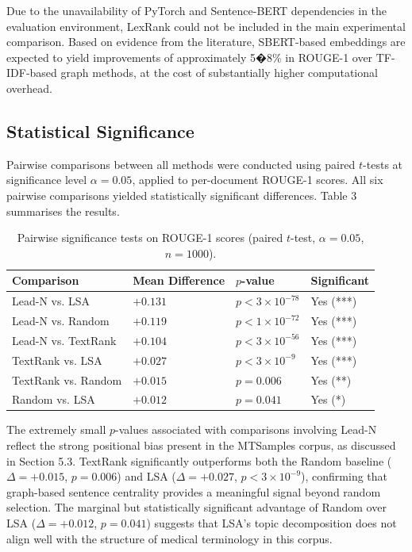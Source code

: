 \documentclass[12pt,twoside,en,win]{bmzhart}
\begin{document}
	Due to the unavailability of PyTorch and Sentence-BERT dependencies in the evaluation environment, LexRank could 
	not be included in the main experimental comparison. Based on evidence from the literature, SBERT-based embeddings 
	are expected to yield improvements of approximately 5�8\% in ROUGE-1 over TF-IDF-based graph methods, at the cost of 
	substantially higher computational overhead.

	\subsection{Statistical Significance}

	Pairwise comparisons between all methods were conducted using paired $t$-tests at significance level $\alpha = 0.05$, 
	applied to per-document ROUGE-1 scores. All six pairwise comparisons yielded statistically significant differences. 
	Table 3 summarises the results.

	\begin{table}[h]
	\centering
	\caption{Pairwise significance tests on ROUGE-1 scores (paired $t$-test, $\alpha = 0.05$, $n = 1000$).}
	\label{tab:significance-tests}
	\begin{tabular}{@{}llll@{}}
	\toprule
	\textbf{Comparison} & \textbf{Mean Difference} & \textbf{$p$-value} & \textbf{Significant} \\ \midrule
	Lead-N vs. LSA      & $+0.131$ & $p < 3 \times 10^{-78}$ & Yes (***) \\
	Lead-N vs. Random   & $+0.119$ & $p < 1 \times 10^{-72}$ & Yes (***) \\
	Lead-N vs. TextRank & $+0.104$ & $p < 3 \times 10^{-56}$ & Yes (***) \\
	TextRank vs. LSA    & $+0.027$ & $p < 3 \times 10^{-9}$  & Yes (***) \\
	TextRank vs. Random & $+0.015$ & $p = 0.006$             & Yes (**)  \\
	Random vs. LSA      & $+0.012$ & $p = 0.041$             & Yes (*)   \\ \bottomrule
	\end{tabular}
	\end{table}

	The extremely small $p$-values associated with comparisons involving Lead-N reflect the strong positional bias present 
	in the MTSamples corpus, as discussed in Section 5.3. TextRank significantly outperforms both the Random baseline 
	($\Delta = +0.015$, $p = 0.006$) and LSA ($\Delta = +0.027$, $p < 3 \times 10^{-9}$), confirming that graph-based 
	sentence centrality provides a meaningful signal beyond random selection. The marginal but statistically significant 
	advantage of Random over LSA ($\Delta = +0.012$, $p = 0.041$) suggests that LSA's topic decomposition does not align 
	well with the structure of medical terminology in this corpus.
\end{document}
